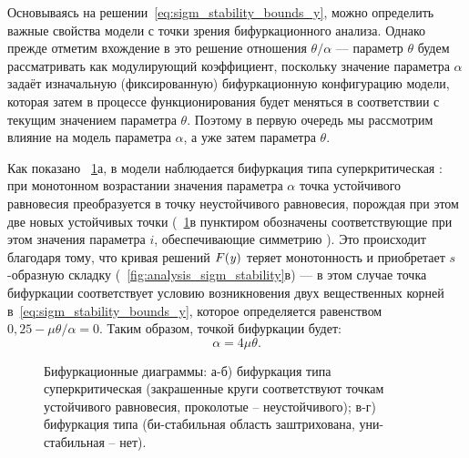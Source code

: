 Основываясь на решении~\eqref{eq:sigm_stability_bounds_y}, можно определить важные свойства модели с точки зрения бифуркационного анализа. Однако прежде отметим вхождение в это решение отношения $\theta/\alpha$ --- параметр $\theta$ будем рассматривать как модулирующий коэффициент, поскольку значение параметра $\alpha$ задаёт изначальную (фиксированную) бифуркационную конфигурацию модели, которая затем в процессе функционирования будет меняться в соответствии с текущим значением параметра $\theta$. Поэтому в первую очередь мы рассмотрим влияние на модель параметра $\alpha$, а уже затем параметра $\theta$.

Как показано \onfigure~\ref{fig:analysis_sigm_bifurcations}а, в модели наблюдается бифуркация типа суперкритическая : при монотонном возрастании значения параметра $\alpha$ точка устойчивого равновесия преобразуется в точку неустойчивого равновесия, порождая при этом две новых устойчивых точки (\onfigure~\ref{fig:analysis_sigm_bifurcations}в пунктиром обозначены соответствующие при этом значения параметра $i$, обеспечивающие симметрию ). Это происходит благодаря тому, что кривая решений $F(\mathit{y})$ теряет монотонность и приобретает $s$-образную складку (\seefigure~\ref{fig:analysis_sigm_stability}в) --- в этом случае точка бифуркации соответствует условию возникновения двух вещественных корней в~\eqref{eq:sigm_stability_bounds_y}, которое определяется равенством $0,25 - \mu \theta / \alpha = 0$. Таким образом, точкой бифуркации будет:
\begin{equation}
    \label{eq:sigm_bifurcation_alpha}
    \alpha =  4 \mu \theta.
\end{equation}

\begin{figure}[ht]
    \caption{Бифуркационные диаграммы: а-б) бифуркация типа суперкритическая  (закрашенные круги соответствуют точкам устойчивого равновесия, проколотые -- неустойчивого); в-г) бифуркация типа  (би-стабильная область заштрихована, уни-стабильная -- нет).}
    \label{fig:analysis_sigm_bifurcations}
\end{figure}

